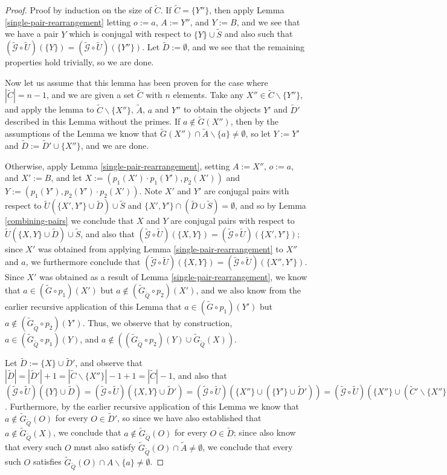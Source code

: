 \documentclass{amsbook}
\theoremstyle{plain}
\theoremstyle{definition}
\theoremstyle{remark}
\newcommand{\set}{\tilde}
\newcommand{\genfun}{\tilde{\mathcal{G}}}
\newcommand{\paren}[1]{\left(#1\right)}
\begin{document}
\begin{proof}
Proof by induction on the size of $\set C$.  If $\set C=\{Y''\}$, then apply Lemma \ref{single-pair-rearrangement} letting $o:=a$, $A:=Y''$, and $Y:=B$, and we see that we have a pair $Y$ which is conjugal with respect to $\{Y\}\cup\set S$ and also such that $(\genfun\circ\set U)(\{Y\})=(\genfun\circ\set U)(\{Y''\})$.  Let $\set D:=\emptyset$, and we see that the remaining properties hold trivially, so we are done.

Now let us assume that this lemma has been proven for the case where $|\set C|=n-1$, and we are given a set $\set C$ with $n$ elements.  Take any $X''\in\set C\backslash\{Y''\}$, and apply the lemma to $\set C\backslash \{X''\}$, $\set A$, $a$ and $Y''$ to obtain the objects $Y'$ and $\set D'$ described in this Lemma without the primes.  If $a\notin\set G(X'')$, then by the assumptions of the Lemma we know that $\set G(X'') \cap \set A\backslash \{a\} \ne \emptyset$, so let $Y:=Y'$ and $\set D:=\set D'\cup\{X''\}$, and we are done.

Otherwise, apply Lemma \ref{single-pair-rearrangement}, setting $A:=X''$, $o:=a$, and $X':=B$, and let $X:=\paren{p_1(X')\cdot p_1(Y'),p_2(X')}$ and $Y:=\paren{p_1(Y'),p_2(Y')\cdot p_2(X')}$.  Note $X'$ and $Y'$ are conjugal pairs with respect to $\set U\paren{\{X',Y'\}\cup\set D}\cup\set S$ and $\{X',Y'\}\cap \paren{\set D\cup\set S}=\emptyset$, and so by Lemma \ref{combining-pairs} we conclude that $X$ and $Y$ are conjugal pairs with respect to $\set U\paren{\{X,Y\}\cup\set D}\cup\set S$, and also that $(\genfun\circ\set U)(\{X,Y\})=(\genfun\circ\set U)(\{X',Y'\})$;  since $X'$ was obtained from applying Lemma \ref{single-pair-rearrangement} to $X''$ and $a$, we furthermore conclude that $(\genfun\circ\set U)(\{X,Y\})=(\genfun\circ\set U)(\{X'',Y'\})$.  Since $X'$ was obtained as a result of Lemma \ref{single-pair-rearrangement}, we know that $a\in (\set G \circ p_1)(X')$ but $a\notin (\set G_{\set Q} \circ p_2)(X')$, and we also know from the earlier recursive application of this Lemma that $a\in (\set G \circ p_1)(Y')$ but $a\notin (\set G_{\set Q} \circ p_2)(Y')$.  Thus, we observe that by construction, $a\in (\set G_{\set Q} \circ p_1)(Y)$, and $a\notin \paren{(\set G_{\set Q} \circ p_2)(Y) \cup \set G_{\set Q}(X)}$.

Let $\set D:=\{X\}\cup\set D'$, and observe that $|\set D|=|\set D'|+1=|\set C\backslash \{X''\}|-1+1=|\set C|-1$, and also that $(\genfun\circ\set U)(\{Y\}\cup\set D)=(\genfun\circ\set U)(\{X,Y\}\cup\set D')=(\genfun\circ\set U)(\{X''\}\cup(\{Y'\}\cup\set D'))=(\genfun\circ\set U)(\{X''\}\cup(\set C'\backslash\{X''\}))=(\genfun\circ\set U)(\set C)$.  Furthermore, by the earlier recursive application of this Lemma we know that $a\notin\set G_{\set Q}(O)$ for every $O\in \set D'$, so since we have also established that $a\notin \set G_{\set Q}(X)$, we conclude that $a\notin\set G_{\set Q}(O)$ for every $O\in \set D$;  since also know that every such $O$ must also satisfy $\set G_{\set Q}(O)\cap \set A \ne \emptyset$, we conclude that every such $O$ satisfies $\set G_{\set Q}(O) \cap A\backslash\{a\}\ne\emptyset$.
\end{proof}
\end{document}
